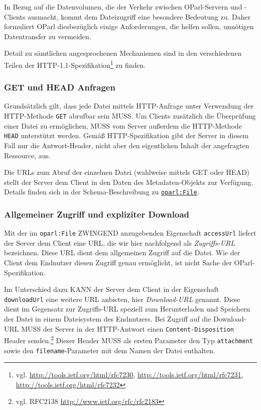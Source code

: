 \documentclass[,a4paper]{article}
\begin{document}
In Bezug auf die Datenvolumen, die der Verkehr zwischen OParl-Servern
und -Clients ausmacht, kommt dem Dateizugriff eine besondere Bedeutung
zu. Daher formuliert OParl diesbezüglich einige Anforderungen, die
helfen sollen, unnötigen Datentransfer zu vermeiden.

Detail zu sämtlichen angesprochenen Mechanismen sind in den
verschiedenen Teilen der HTTP-1.1-Spezifikation\footnote{vgl.
  \url{http://tools.ietf.org/html/rfc7230},
  \url{http://tools.ietf.org/html/rfc7231},
  \url{http://tools.ietf.org/html/rfc7232}} zu finden.

\subsubsection{GET und HEAD Anfragen}\label{get-und-head-anfragen}

Grundsätzlich gilt, dass jede Datei mittels HTTP-Anfrage unter
Verwendung der HTTP-Methode \texttt{GET} abrufbar sein MUSS. Um Clients
zusätzlich die Überprüfung einer Datei zu ermöglichen, MUSS vom Server
außerdem die HTTP-Methode \texttt{HEAD} unterstützt werden. Gemäß
HTTP-Spezifikation gibt der Server in diesem Fall nur die
Antwort-Header, nicht aber den eigentlichen Inhalt der angefragten
Ressource, aus.

Die URLs zum Abruf der einzelnen Datei (wahlweise mittels GET oder HEAD)
stellt der Server dem Client in den Daten des Metadaten-Objekts zur
Verfügung. Details finden sich in der Schema-Beschreibung zu
\hyperref[oparlux5fdocument]{\texttt{oparl:File}}.

\subsubsection{Allgemeiner Zugriff und expliziter
Download}\label{allgemeiner-zugriff-und-expliziter-download}

Mit der im \texttt{oparl:File} ZWINGEND anzugebenden Eigenschaft
\texttt{accessUrl} liefert der Server dem Client eine URL, die wir hier
nachfolgend als \emph{Zugriffs-URL} bezeichnen. Diese URL dient dem
allgemeinen Zugriff auf die Datei. Wie der Client dem Endnutzer diesen
Zugriff genau ermöglicht, ist nicht Sache der OParl-Spezifikation.

Im Unterschied dazu KANN der Server dem Client in der Eigenschaft
\texttt{downloadUrl} eine weitere URL anbieten, hier \emph{Download-URL}
genannt. Diese dient im Gegensatz zur Zugriffs-URL speziell zum
Herunterladen und Speichern der Datei in einem Dateisystem des
Endnutzers. Bei Zugriff auf die Download-URL MUSS der Server in der
HTTP-Antwort einen \texttt{Content-Disposition} Header senden.\footnote{vgl.
  RFC2138 \url{http://www.ietf.org/rfc/rfc2183}} Dieser Header MUSS als
ersten Parameter den Typ \texttt{attachment} sowie den
\texttt{filename}-Parameter mit dem Namen der Datei enthalten.
\end{document}
